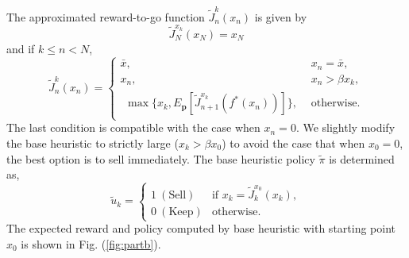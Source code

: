 \documentclass[11pt]{article}
\begin{document}
\begin{enumerate}[label=(\alph*)]
    The approximated reward-to-go function $\tilde{J}^k_n(x_n)$ is given by
    \[
    \tilde{J}^{x_k}_N(x_N) = x_N
    \]
    and if $k \le n < N$,
    \begin{equation}
    \tilde{J}^k_n(x_n) = 
    \begin{cases}
        \bar x, & x_n = \bar x, \\
        x_n, & x_n > \beta x_k, \\
        \begin{split}
          \max \{x_k, E_{\boldsymbol p}[\tilde{J}^{x_k}_{n+1}(f^*(x_n))] \}, 
        \end{split} & \text{otherwise}.
    \end{cases}
    \end{equation}
    The last condition is compatible with the case when $x_n = 0$.
    We slightly modify the base heuristic to strictly large ($x_k > \beta x_0$) to avoid the case that when $x_0 = 0$, the best option is to sell immediately.
    The base heuristic policy $\tilde \pi$ is determined as,
    \[
    \tilde u_k = \begin{cases}
        1 ~(\text{Sell}) & \text{if } x_k = \tilde{J}_k^{x_0}(x_k), \\
        0 ~(\text{Keep}) & \text{otherwise}.
    \end{cases}
    \]
    The expected reward and policy computed by base heuristic with starting point $x_0$ is shown in Fig. (\ref{fig:partb}).


\end{enumerate}
\end{document}
